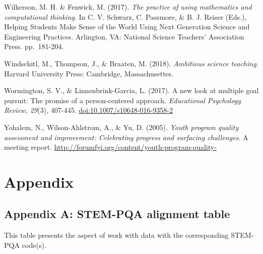 \documentclass[]{msu-thesis}
\theoremstyle{definition}
\theoremstyle{definition}
\theoremstyle{definition}
\theoremstyle{remark}
\begin{document}
Wilkerson, M. H. \& Fenwick, M. (2017). \emph{The practice of using
mathematics and computational thinking}. In C. V. Schwarz, C. Passmore,
\& B. J. Reiser (Eds.), Helping Students Make Sense of the World Using
Next Generation Science and Engineering Practices. Arlington, VA:
National Science Teachers' Association Press. pp.~181-204.

Windschitl, M., Thompson, J., \& Braaten, M. (2018). \emph{Ambitious
science teaching}. Harvard University Press: Cambridge, Massachusettes.

Wormington, S. V., \& Linnenbrink-Garcia, L. (2017). A new look at
multiple goal pursuit: The promise of a person-centered approach.
\emph{Educational Psychology Review, 29}(3), 407-445.
\url{doi:10.1007/s10648-016-9358-2}

Yohalem, N., Wilson-Ahlstrom, A., \& Yu, D. (2005). \emph{Youth program
quality assessment and improvement: Celebrating progress and surfacing
challenges}. A meeting report.
\url{http://forumfyi.org/content/youth-program-quality-}

\chapter{Appendix}\label{appendix}

\setlength{\parindent}{0in} \setlength{\leftskip}{0in}
\setlength{\parskip}{8pt} \noindent

\section{Appendix A: STEM-PQA alignment
table}\label{appendix-a-stem-pqa-alignment-table}

This table presents the aspect of work with data with the corresponding
STEM-PQA code(s).

\begin{landscape}\begin{table}

\caption{\label{tab:unnamed-chunk-16}Alignment of codes for instructional support for work with data and the STEM-PQA}
\centering
{}
\end{table}
\end{landscape}
\end{document}
